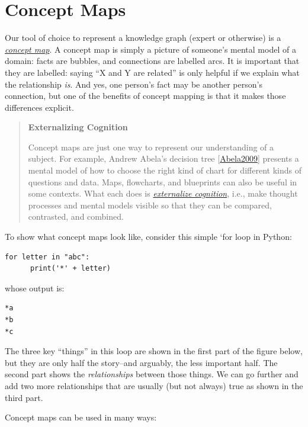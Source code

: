 \documentclass[10pt,statementpaper]{memoir}
\begin{document}
\section{Concept Maps}\label{concept-maps}

Our tool of choice to represent a knowledge graph (expert or otherwise)
is a \emph{\href{gloss.html\#concept-map}{concept map}}. A concept map
is simply a picture of someone's mental model of a domain: facts are
bubbles, and connections are labelled arcs. It is important that they
are labelled: saying ``X and Y are related'' is only helpful if we
explain what the relationship \emph{is}. And yes, one person's fact may
be another person's connection, but one of the benefits of concept
mapping is that it makes those differences explicit.

\newpage

\begin{quote}
\textbf{Externalizing Cognition}

Concept maps are just one way to represent our understanding of a
subject. For example, Andrew Abela's decision tree
{[}\href{biblio.html\#abela-chart}{Abela2009}{]} presents a mental model
of how to choose the right kind of chart for different kinds of
questions and data. Maps, flowcharts, and blueprints can also be useful
in some contexts. What each does is
\emph{\href{gloss.html\#externalized-cognition}{externalize cognition}},
i.e., make thought processes and mental models visible so that they can
be compared, contrasted, and combined.
\end{quote}

To show what concept maps look like, consider this simple `for loop in
Python:

\begin{verbatim}
for letter in "abc":
      print('*' + letter)
\end{verbatim}

whose output is:

\begin{verbatim}
*a
*b
*c
\end{verbatim}

The three key ``things'' in this loop are shown in the first part of the
figure below, but they are only half the story--and arguably, the less
important half. The second part shows the \emph{relationships} between
those things. We can go further and add two more relationships that are
usually (but not always) true as shown in the third part.

Concept maps can be used in many ways:
\end{document}
